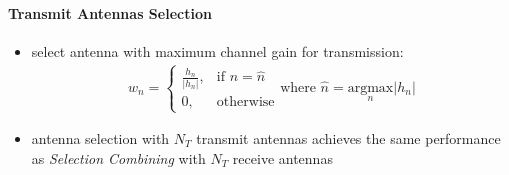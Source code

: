 \documentclass[a4paper, 10pt]{article}
\begin{document}
\paragraph{Transmit Antennas Selection}
\begin{itemize}
	\item select antenna with maximum channel gain for transmission:
		\begin{align*} 
			w_n = 
			\begin{cases}
\frac{h_n}{|h_n|},  & \text{if } n = \hat{n}\\
0, & \text{otherwise}
\end{cases} \text{where } \hat{n} = \underset{n}{\mathrm{argmax}}|h_n|
		\end{align*}
	\item antenna selection with $ N_T$ transmit antennas achieves the same performance as \textit{Selection Combining} with $ N_T$ receive antennas
\end{itemize}
\end{document}
